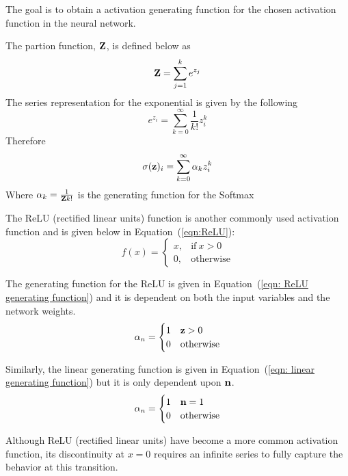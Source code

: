 The goal is to obtain a activation generating function for the chosen activation function in the neural network.

The partion function, $\bold Z$, is defined below as
\begin{equation}
	\bold Z = \sum\limits_{j=1}^k e^{z_j}
\end{equation}
The series representation for the exponential is given by the following
\begin{equation}
	e^{z_{i}} = \sum_{k=0}^{\infty}\frac{1}{k!} z_{i}^{k}
\end{equation}
Therefore
\begin{equation}
	\sigma(\bold z)_i =
	\sum\limits_{k=0}^{\infty} \alpha_{k}z_{i}^{k}
\end{equation}
Where $\alpha_k = \frac{1}{{\bold Z}k!}$ is the generating function for the Softmax


The ReLU (rectified linear units) function is another commonly used activation function and is given below in Equation~(\ref{eqn:ReLU}):
\begin{equation}
	f(x) =
	\begin{cases}
		x, & \text{if}\ x > 0 \\
		0, & \text{otherwise}
	\end{cases}
	\label{eqn:ReLU}
\end{equation}

The generating function for the ReLU is given in Equation~(\ref{eqn: ReLU generating function}) and it is dependent on both the input variables and the network weights.
\begin{equation}
	\alpha_n =
		\begin{cases}
			1 & \bold z > 0 \\
			0 & \text{otherwise}
		\end{cases}
	\label{eqn: ReLU generating function}
\end{equation}

Similarly, the linear generating function is given in Equation~(\ref{eqn: linear generating function}) but it is only dependent upon $\bold n$.
\begin{equation}
	\alpha_n =
		\begin{cases}
			1 & \bold n = 1 \\
			0 & \text{otherwise}
		\end{cases}
	\label{eqn: linear generating function}
\end{equation}

Although ReLU (rectified linear units) have become a more common activation function, its discontinuity at $x = 0$ requires an infinite series to fully capture the behavior at this transition.

